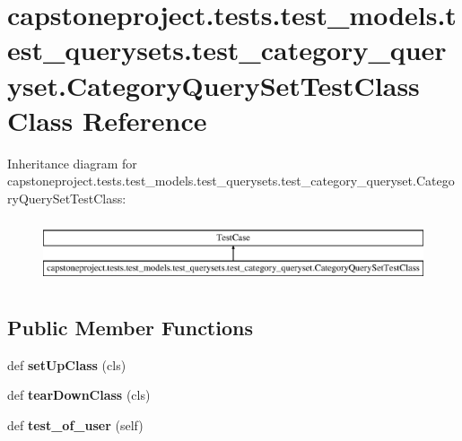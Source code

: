 \hypertarget{classcapstoneproject_1_1tests_1_1test__models_1_1test__querysets_1_1test__category__queryset_1_1_category_query_set_test_class}{}\section{capstoneproject.\+tests.\+test\+\_\+models.\+test\+\_\+querysets.\+test\+\_\+category\+\_\+queryset.\+Category\+Query\+Set\+Test\+Class Class Reference}
\label{classcapstoneproject_1_1tests_1_1test__models_1_1test__querysets_1_1test__category__queryset_1_1_category_query_set_test_class}
Inheritance diagram for capstoneproject.\+tests.\+test\+\_\+models.\+test\+\_\+querysets.\+test\+\_\+category\+\_\+queryset.\+Category\+Query\+Set\+Test\+Class\+:\begin{figure}[H]
\begin{center}
\leavevmode
\includegraphics[height=1.895093cm]{classcapstoneproject_1_1tests_1_1test__models_1_1test__querysets_1_1test__category__queryset_1_1_category_query_set_test_class}
\end{center}
\end{figure}
\subsection*{Public Member Functions}
\begin{DoxyCompactItemize}
\item 
\mbox{\label{classcapstoneproject_1_1tests_1_1test__models_1_1test__querysets_1_1test__category__queryset_1_1_category_query_set_test_class_a99fb8cc173a678313c0de402d3a65fcf}} 
def {\bfseries set\+Up\+Class} (cls)
\item 
\mbox{\label{classcapstoneproject_1_1tests_1_1test__models_1_1test__querysets_1_1test__category__queryset_1_1_category_query_set_test_class_a0906573b394ef0397647a6085f6f83a4}} 
def {\bfseries tear\+Down\+Class} (cls)
\item 
\mbox{\label{classcapstoneproject_1_1tests_1_1test__models_1_1test__querysets_1_1test__category__queryset_1_1_category_query_set_test_class_a8e6b1a7c9cda3abcb7566de490c3acd2}} 
def {\bfseries test\+\_\+of\+\_\+user} (self)
\end{DoxyCompactItemize}
